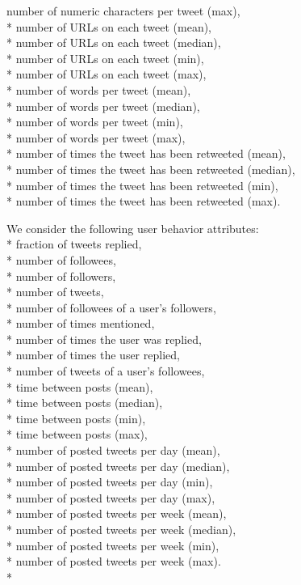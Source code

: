 \documentclass[11pt]{article}
\begin{document}
number of numeric characters per tweet (max),\\*
number of URLs on each tweet (mean),\\*
number of URLs on each tweet (median),\\*
number of URLs on each tweet (min),\\*
number of URLs on each tweet (max),\\*
number of words per tweet (mean),\\*
number of words per tweet (median),\\*
number of words per tweet (min),\\*
number of words per tweet (max),\\*
number of times the tweet has been retweeted (mean),\\*
number of times the tweet has been retweeted (median), \\*
number of times the tweet has been retweeted (min), \\*
number of times the tweet has been retweeted (max).

\newpage
We consider the following user behavior attributes: \\*
\newline
fraction of tweets replied,\\*
number of followees,\\*
number of followers,\\*
number of tweets,\\*
number of followees of a user's followers,\\*
number of times mentioned,\\*
number of times the user was replied,\\*
number of times the user replied,\\*
number of tweets of a user's followees,\\*
time between posts (mean),\\*
time between posts (median),\\*
time between posts  (min),\\*
time between posts (max),\\*
number of posted tweets per day (mean),\\*
number of posted tweets per day (median),\\*
number of posted tweets per day (min),\\*
number of posted tweets per day (max),\\*
number of posted tweets per week (mean),\\*
number of posted tweets per week (median),\\*
number of posted tweets per week (min),\\*
number of posted tweets per week (max).\\*
\end{document}
